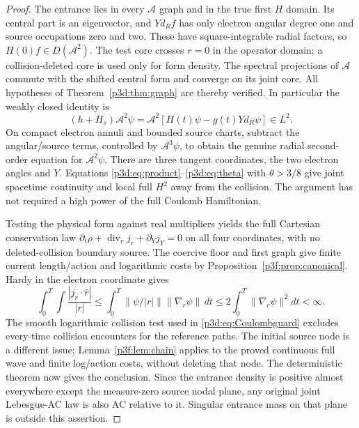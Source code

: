 \documentclass[11pt]{article}
\numberwithin{equation}{section}
\theoremstyle{definition}
\theoremstyle{remark}
\begin{document}
\begin{proof}
The entrance lies in every $\mathcal A$ graph and in the true first
$H$ domain. Its central part is an eigenvector, and $Yd_R f$
has only electron angular degree one and source occupations zero
and two. These have square-integrable radial factors, so
$H(0)f\in D(\mathcal A^2)$. The test core crosses $r=0$ in the
operator domain; a collision-deleted core is used only for form
density. The spectral projections of $\mathcal A$ commute with the shifted central
form and converge on its joint core. All hypotheses of
Theorem~\ref{p3d:thm:graph} are thereby verified.
In particular the weakly closed identity is
\[
 (h+H_s)\mathcal A^2\psi
       =\mathcal A^2[H(t)\psi-g(t)Yd_R\psi]\in L^2 .
\]
On compact electron annuli and bounded source charts, subtract the
angular/source terms, controlled by $\mathcal A^3\psi$, to obtain the
genuine radial second-order equation for $\mathcal A^2\psi$.
There are three tangent coordinates, the two electron angles and $Y$.
Equations \eqref{p3d:eq:product}--\eqref{p3d:eq:theta} with
$\theta>3/8$ give joint spacetime continuity and local full $H^2$
away from the collision. The argument has not required a high power
of the full Coulomb Hamiltonian.

Testing the physical form against real multipliers yields the full
Cartesian conservation law
$\partial_t\rho+\operatorname{div}_rj_r+\partial_Yj_Y=0$
on all four coordinates, with no deleted-collision boundary source.
The coercive floor and first graph give finite current length/action
and logarithmic costs by Proposition~\ref{p3f:prop:canonical}.
Hardy in the electron coordinate gives
\[
 \int_0^T\!\int\frac{|j_r\cdot\widehat r|}{|r|}
 \leq\int_0^T\|\psi/|r|\|\|\nabla_r\psi\|\,dt
 \leq2\int_0^T\|\nabla_r\psi\|^2dt<\infty.
\]
The smooth logarithmic collision test used in
\eqref{p3d:eq:Coulombguard} excludes every-time collision encounters
for the reference paths. The initial source node is a different
issue; Lemma~\ref{p3f:lem:chain} applies to the proved continuous
full wave and finite log/action costs, without deleting that node.
The deterministic theorem now gives the conclusion. Since the
entrance density is positive almost everywhere except the
measure-zero source nodal plane, any original joint Lebesgue-AC
law is also AC relative to it. Singular entrance mass on that
plane is outside this assertion.
\end{proof}
\end{document}
